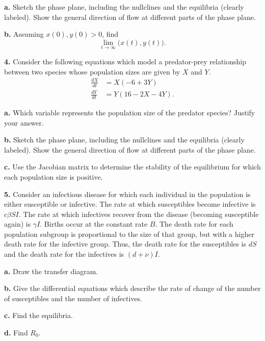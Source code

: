 \documentclass[reqno,12pt]{amsart}
\def \dXdt{\frac{dX}{dt}}
\def \dYdt{\frac{dY}{dt}}
\begin{document}
\noindent
{\bf a.}  Sketch the phase plane, including the nullclines and the
equilibria (clearly labeled).  Show the general direction of
flow at different parts of the phase plane.

\noindent
{\bf b.}  Assuming $x(0), y(0) > 0$, find
$$
\lim_{t \to \infty} \bigl( x(t), y(t) \bigr).
$$



\vspace{1cm}

\noindent
{\bf 4.}  Consider the following equations which model a predator-prey
relationship between two species whose population sizes are given
by $X$ and $Y$.
$$
\begin{aligned}
\dXdt &= X ( -6 + 3Y)		\\
\dYdt &= Y ( 16 - 2X - 4Y).
\end{aligned}
$$


\noindent
{\bf a.} Which variable represents the population size of the predator
species?  Justify your answer.

\noindent
{\bf b.}  Sketch the phase plane, including the nullclines and the
equilibria (clearly labeled).  Show the general direction of
flow at different parts of the phase plane.

\noindent
{\bf c.}  Use the Jacobian matrix to determine the stability of the
equilibrium for which each population size is positive.



\vspace{1cm}

\noindent
{\bf 5.}  Consider an infectious disease for which each individual
in the population is either susceptible or infective.  The rate
at which susceptibles become infective is $c \beta S I$.  The
rate at which infectives recover from the disease (becoming
susceptible again) is $\gamma I$.  Births occur at the constant
rate $B$.  The death rate for each population subgroup is
proportional to the size of that group, but with a higher death
rate for the infective group.  Thus, the death rate for the
susceptibles is $d S$ and the death rate for the infectives
is $(d+\nu) I$.

\noindent
{\bf a.}  Draw the transfer diagram.

\noindent
{\bf b.}  Give the differential equations which describe the rate of
change of the number of susceptibles and the number of infectives.

\noindent
{\bf c.}  Find the equilibria.

\noindent
{\bf d.}  Find $R_0$.
\end{document}
